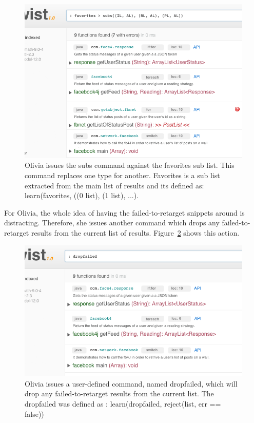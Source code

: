 \begin{figure}[!ht]
    \centering
    \includegraphics[width=\textwidth]{images/twistretarget}
    \caption{Olivia issues the subs command against the favorites sub list. This command 
	 replaces one type for another. Favorites is a sub list extracted from the main list of results and its defined as: learn(favorites, ((0 list), (1 list), ...).}
    \label{fig:twistretarget}
\end{figure} 

For Olivia, the whole idea of having the failed-to-retarget snippets around is distracting. Therefore, she issues another command which drops any failed-to-retarget results from the current list of results. Figure~\ref{fig:twistclean} shows this action. 

\begin{figure}[!ht]
    \centering
    \includegraphics[width=\textwidth]{images/twistclean}
    \caption{Olivia issues a user-defined command, named dropfailed, which will drop 
	 any failed-to-retarget results from the current list. The dropfailed was defined as : 
	 learn(dropfailed, reject(list, err == false))}
    \label{fig:twistclean}
\end{figure}   

